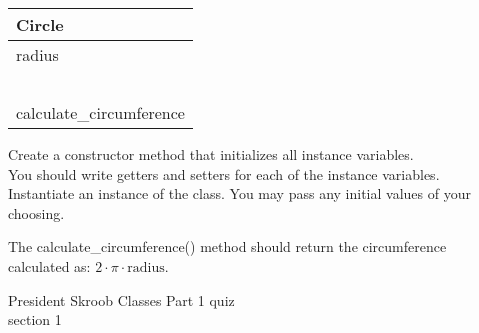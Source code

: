 \documentclass{article}
\newcommand{\tab}{\hspace*{0.25in}}
\begin{document}
\begin{enumerate}
\begin{minipage}{.4\textwidth}
		\vspace*{1em}
		\begin{tabular}{|l|}
			\hline Circle\\ \hline
			radius\\ \ \\  \hline
			calculate\_circumference\\ \hline
		\end{tabular}
	\end{minipage}

	\vspace*{2ex}
	Create a constructor method that initializes all instance variables.\\
	You should write getters and setters for each of the instance variables.\\
	Instantiate an instance of the class. You may pass any initial values of your choosing.	

	The calculate\_circumference() method should return the circumference calculated as: $2 \cdot \pi \cdot \text{radius}$.\\





\end{enumerate}
\pagebreak
President Skroob \hfill Classes Part 1 quiz\\
section 1\\
\end{document}
